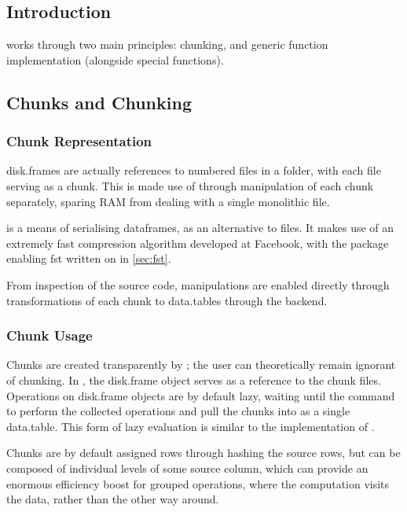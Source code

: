 \subsection{Introduction}\label{sec:disk-frame-introduction}

 works through two main principles: chunking, and generic function implementation (alongside special functions).

\subsection{Chunks and Chunking}\label{sec:chunking}

\subsubsection{Chunk Representation}\label{sec:chunk-representation}

disk.frames are actually references to numbered  files in a folder, with each file serving as a chunk.
This is made use of through manipulation of each chunk separately, sparing RAM from dealing with a single monolithic file\cite{zj19:_inges_data}.

 is a means of serialising dataframes, as an alternative to 
files\cite{klik2022fst}.
It makes use of an extremely fast compression algorithm developed at Facebook, with the \R{} package enabling fst written on in \cref{sec:fst}.

From inspection of the source code,  manipulations are enabled directly through transformations of each chunk to data.tables through the  backend.

\subsubsection{Chunk Usage}\label{sec:making-chunks}

Chunks are created transparently by ; the user can theoretically remain ignorant of chunking.
In \R{}, the disk.frame object serves as a reference to the chunk files.
Operations on disk.frame objects are by default lazy, waiting until the  command to perform the collected operations and pull the chunks into \R{} as a single data.table.
This form of lazy evaluation is similar to the implementation of .

Chunks are by default assigned rows through hashing the source rows, but can be composed of individual levels of some source column, which can provide an enormous efficiency boost for grouped operations, where the computation visits the data, rather than the other way around.

